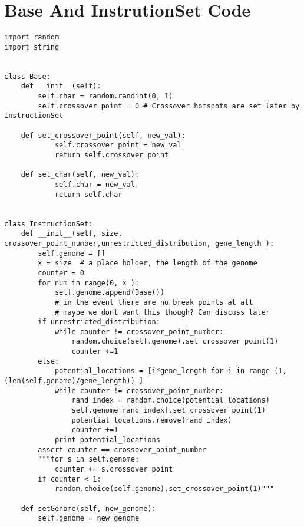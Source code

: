 \documentclass[a4paper]{article}
\begin{document}
\section{Base And InstrutionSet Code}
\label{sec-6}
\begin{verbatim}
import random
import string


class Base:
    def __init__(self):
        self.char = random.randint(0, 1)
        self.crossover_point = 0 # Crossover hotspots are set later by InstructionSet

    def set_crossover_point(self, new_val):
            self.crossover_point = new_val
            return self.crossover_point

    def set_char(self, new_val):
            self.char = new_val
            return self.char


class InstructionSet:
    def __init__(self, size, crossover_point_number,unrestricted_distribution, gene_length ):
        self.genome = []
        x = size  # a place holder, the length of the genome
        counter = 0 
        for num in range(0, x ):
            self.genome.append(Base())
            # in the event there are no break points at all
            # maybe we dont want this though? Can discuss later
        if unrestricted_distribution:
            while counter != crossover_point_number:
                random.choice(self.genome).set_crossover_point(1)
                counter +=1 
        else:
            potential_locations = [i*gene_length for i in range (1, (len(self.genome)/gene_length)) ]
            while counter != crossover_point_number:
                rand_index = random.choice(potential_locations)
                self.genome[rand_index].set_crossover_point(1)
                potential_locations.remove(rand_index)
                counter +=1
            print potential_locations
        assert counter == crossover_point_number 
        """for s in self.genome:
            counter += s.crossover_point
        if counter < 1:
            random.choice(self.genome).set_crossover_point(1)"""

    def setGenome(self, new_genome):
        self.genome = new_genome



\end{verbatim}
\end{document}

